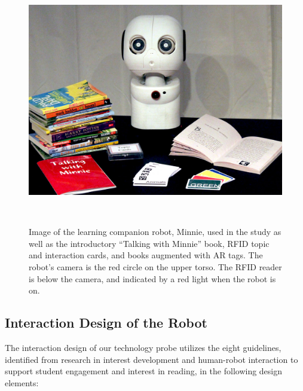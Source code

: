 \documentclass{sigchi}
\begin{document}
\begin{figure}
	\centering
	\includegraphics[width=\columnwidth]{figures/Complete-Minnie-System.jpg}
	\caption{Image of the learning companion robot, Minnie, used in the study as well as the introductory ``Talking with Minnie'' book, RFID topic and interaction cards, and books augmented with AR tags. The robot's camera is the red circle on the upper torso. The RFID reader is below the camera, and indicated by a red light when the robot is on. }~\label{fig:complete-system}\vspace{-8pt}
\end{figure}

\subsection{Interaction Design of the Robot}

The interaction design of our technology probe utilizes the eight guidelines, identified from research in interest development and human-robot interaction to support student engagement and interest in reading, in the following design elements:
\end{document}
